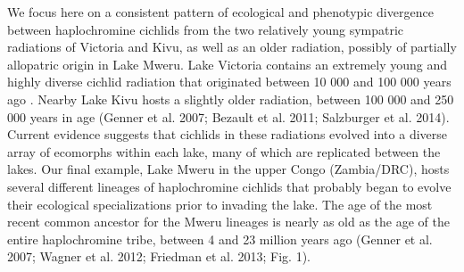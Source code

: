We focus here on a consistent pattern of ecological and phenotypic divergence between haplochromine cichlids from the two relatively young sympatric radiations of Victoria and Kivu, as well as an older radiation, possibly of partially allopatric origin in Lake Mweru. Lake Victoria contains an extremely young and highly diverse cichlid radiation that originated between 10 000 and 100 000 years ago \cite{seehausen2002patterns, genner2007age, salzburger2014ecology}. Nearby Lake Kivu hosts a slightly older radiation, between 100 000 and 250 000 years in age \cite{genn} (Genner et al. 2007; Bezault et al. 2011; Salzburger et al. 2014). Current evidence suggests that cichlids in these radiations evolved into a diverse array of ecomorphs within each lake, many of which are replicated between the lakes. Our final example, Lake Mweru in the upper Congo (Zambia/DRC), hosts several different lineages of haplochromine cichlids that probably began to evolve their ecological specializations prior to invading the lake. The age of the most recent common ancestor for the Mweru lineages is nearly as old as the age of the entire haplochromine tribe, between 4 and 23 million years ago (Genner et al. 2007; Wagner et al. 2012; Friedman et al. 2013; Fig. 1).

